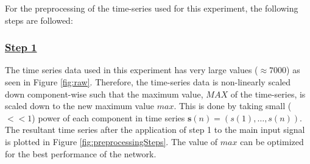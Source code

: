 For the preprocessing of the time-series used for this experiment, the following steps are followed:
\subsubsection*{\underline{Step 1}}%
The time series data used in this experiment has very large values ($\approx  7000$) as seen in Figure \ref{fig:raw}.  Therefore, the time-series data is non-linearly scaled down  component-wise such that the maximum value, $MAX$ of the time-series, is scaled down to the new maximum value $max$. This is done by taking small ($< < 1$) power of each component in time series $\mathbf{s}(n) = (s(1),\hdots,s(n))$. The resultant time series after the application of step 1 to the main input signal is plotted in Figure \ref{fig:preprocessingSteps}.
The value of $max$ can be optimized for the best performance of the network.


